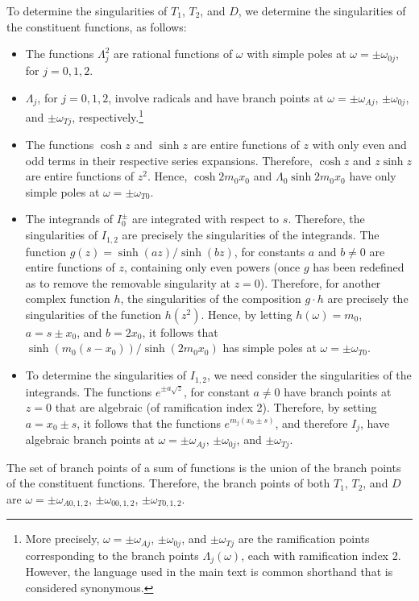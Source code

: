 \documentclass[12pt]{../style-files/ociamthesis}
\begin{document}
To determine the singularities of  $T_1$, $T_2$, and $D$, we determine the singularities of the constituent functions, as follows:
\begin{itemize}
	\item The functions $\Lambda_j^2$ are rational functions of $\omega$ with simple poles at $\omega = \pm \omega_{0j}$, for $j = 0, 1, 2$.
	
	\item $\Lambda_j$, for $j = 0, 1, 2$, involve radicals and have branch points at $\omega = \pm \omega_{Aj}$, $\pm \omega_{0j}$, and $\pm \omega_{Tj}$, respectively.\footnote{More precisely, $\omega = \pm \omega_{Aj}$, $\pm \omega_{0j}$, and $\pm \omega_{Tj}$ are the ramification points corresponding to the branch points $\Lambda_j(\omega)$, each with ramification index 2. However, the language used in the main text is common shorthand that is considered synonymous.}
	
	\item The functions $\cosh{z}$ and $\sinh{z}$ are entire functions of $z$ with only even and odd terms in their respective series expansions. Therefore, $\cosh{z}$ and $z\sinh{z}$ are entire functions of $z^2$. Hence, $\cosh{2m_0x_0}$ and $\Lambda_0\sinh{2m_0x_0}$ have only simple poles at $\omega = \pm\omega_{T0}$.
	
	\item The integrands of $I_0^\pm$ are integrated with respect to $s$. Therefore, the singularities of $I_{1,2}$ are precisely the singularities of the integrands. The function $g(z) = \sinh(az) / \sinh(bz)$, for constants $a$ and $b \neq 0$ are entire functions of $z$, containing only even powers (once $g$ has been redefined as to remove the removable singularity at $z = 0$). Therefore, for another complex function $h$, the singularities of the composition $g \cdot h$ are precisely the singularities of the function $h(z^2)$. Hence, by letting $h(\omega) = m_0$, $a = s \pm x_0$, and $b = 2x_0$, it follows that $\sinh(m_0(s - x_0)) / \sinh(2m_0x_0)$ has simple poles at $\omega = \pm \omega_{T0}$.
	
	\item To determine the singularities of $I_{1,2}$, we need consider the singularities of the integrands. The functions $e^{\pm a\sqrt{z}}$, for constant $a \neq 0$ have branch points at $z = 0$ that are algebraic (of ramification index 2). Therefore, by setting $a = x_0 \pm s$, it follows that the functions $e^{m_j(x_0 \pm s)}$, and therefore $I_j$, have algebraic branch points at $\omega = \pm \omega_{Aj}$, $\pm \omega_{0j}$, and $\pm \omega_{Tj}$.
\end{itemize}
The set of branch points of a sum of functions is the union of the branch points of the constituent functions. Therefore, the branch points of both $T_1$, $T_2$, and $D$ are $\omega = \pm \omega_{A0,1,2}$, $\pm \omega_{00,1,2}$, $\pm \omega_{T0,1,2}$.
\end{document}
